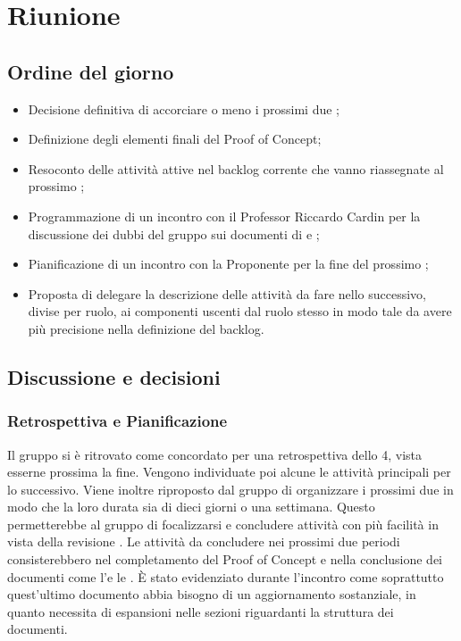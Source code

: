 \section{Riunione}
\subsection{Ordine del giorno}
\begin{itemize}
	\item Decisione definitiva di accorciare o meno i prossimi  due ;
	\item Definizione degli elementi finali del Proof of Concept;
	\item Resoconto delle attività attive nel backlog corrente che vanno riassegnate al prossimo ;
	\item Programmazione di un incontro con il Professor Riccardo Cardin per la discussione dei dubbi del gruppo sui documenti di \AdR e \PdQ;
	\item Pianificazione di un incontro con la Proponente per la fine del prossimo ;
	\item Proposta di delegare la descrizione delle attività da fare nello  successivo, divise per ruolo, ai componenti uscenti dal ruolo stesso in modo tale da avere più precisione nella definizione del backlog.
\end{itemize}

\subsection{Discussione e decisioni}
\subsubsection{Retrospettiva e Pianificazione}
\par Il gruppo si è ritrovato come concordato per una retrospettiva dello  4, vista esserne prossima la fine. Vengono individuate poi alcune le attività principali per lo  successivo. 
Viene inoltre riproposto dal gruppo di organizzare i prossimi due  in modo che la loro durata sia di dieci giorni o una settimana. 
Questo permetterebbe al gruppo di focalizzarsi e concludere attività con più facilità in vista della revisione \RTB.
Le attività da concludere nei prossimi due periodi consisterebbero nel completamento del Proof of Concept e nella conclusione dei documenti come l'\AdR e le \NdP.
È stato evidenziato durante l'incontro come soprattutto quest'ultimo documento abbia bisogno di un aggiornamento sostanziale, in quanto necessita di espansioni nelle sezioni riguardanti la struttura dei documenti.

